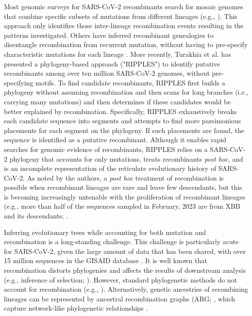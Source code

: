 \documentclass{article}
\begin{document}
Most genomic surveys for SARS-CoV-2 recombinants search for mosaic genomes that
combine specific subsets of mutations from different lineages (e.g.,
\cite{VanInsberghe2021-eu,Jackson2021-ik,Wertheim2022-hj,Sekizuka2022-xz}).
This approach only identifies those inter-lineage recombination events
resulting in the patterns investigated. Others have inferred recombinant
genealogies to disentangle recombination from recurrent mutation, without
having to pre-specify characteristic mutations for each lineage
\cite{Ignatieva2021-rg}. More recently, Turakhia et al. \cite{Turakhia2022-it}
has presented a phylogeny-based approach ("RIPPLES") to identify putative
recombinants among over ten million SARS-CoV-2 genomes, without pre-specifying
motifs. To find candidate recombinants, RIPPLES first builds a phylogeny
without assuming recombination and then scans for long branches (i.e., carrying
many mutations) and then determines if these candidates would be better
explained by recombination. Specifically, RIPPLES exhaustively breaks each
candidate sequence into segments and attempts to find more parsimonious
placements for each segment on the phylogeny. If such placements are found, the
sequence is identified as a putative recombinant. Although it enables rapid
searches for genomic evidence of recombinants, RIPPLES relies on a SARS-CoV-2
phylogeny that accounts for only mutations, treats recombinants \textit{post
hoc}, and is an incomplete representation of the reticulate evolutionary
history of SARS-CoV-2. As noted by the authors, a \textit{post hoc} treatment
of recombination is possible when recombinant lineages are rare and leave few
descendants, but this is becoming increasingly untenable with the proliferation
of recombinant lineages (e.g., more than half of the sequences sampled in
February, 2023 are from XBB and its descendants; \cite{Chen2022-pz}.

Inferring evolutionary trees while accounting for both mutation and
recombination is a long-standing challenge. This challenge is particularly
acute for SARS-CoV-2, given the large amount of data that has been shared, with
over 15 million sequences in the GISAID database \cite{Shu2017-hp}. It is well
known that recombination distorts phylogenies \cite{Schierup2000-fg} and
affects the results of downstream analysis (e.g., inference of selection;
\cite{Anisimova2003-vr}). However, standard phylogenetic methods do not account
for recombination (e.g., \cite{Ronquist2012-zw,Minh2020-lr,Guindon2003-zd}).
Alternatively, genetic ancestries of recombining lineages can be represented by
ancestral recombination graphs (ARG; \cite{Griffiths1981-lw,Hudson1983-if},
which  capture network-like phylogenetic relationships \cite{Gusfield2014-qw}.
\end{document}
